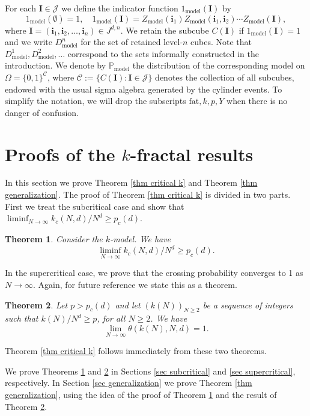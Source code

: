 \documentclass[11pt,a4paper]{article}
\newcommand{\Ib}{\ensuremath{\mathbf{I}}}
\newcommand{\Ii}{\ensuremath{\mathbf{i}}}
\newcommand{\pc}{\ensuremath{p_{c}(d)}}
\newcommand{\IP}{\ensuremath{\mathbb{P}}}
\newcommand{\CC}{\ensuremath{\mathcal{C}}}
\newcommand{\JJ}{\ensuremath{\mathcal{J}}}
\newtheorem{theorem}{Theorem}[section]
\theoremstyle{remark}
\begin{document}
For each $\Ib \in \JJ$ we define the indicator function $1_{\text{model}}(\Ib)$ by
\[
1_{\text{model}}(\emptyset)=1,\quad 1_{\text{model}}(\Ib)=Z_{\text{model}}(\Ii_1) Z_{\text{model}}(\Ii_1,\Ii_2) \cdots Z_{\text{model}}(\Ib),
\]
where $\Ib=(\Ii_1,\Ii_2,\ldots,\Ii_n) \in J^{d,n}$. We retain the subcube $C(\Ib)$ if $1_{\text{model}}(\Ib)=1$ and we write $D_{\text{model}}^n$ for the set of retained level-$n$ cubes. Note that $D_{\text{model}}^1, D_{\text{model}}^2, \ldots$ correspond to the sets informally constructed in the introduction. We denote by $\IP_{\text{model}}$ the distribution of the corresponding model on $\Omega = \{0,1\}^{\CC}$, where $\CC:=\{C(\Ib): \Ib \in \JJ\}$ denotes the collection of all subcubes, endowed with the usual sigma algebra generated by the cylinder events. To simplify the notation, we will drop the subscripts $\text{fat},k,p,Y$ when there is no danger of confusion.



\section[Proofs of the k-fractal results]{Proofs of the $k$-fractal results}\label{sec proof k fractal}

In this section we prove Theorem \ref{thm critical k} and Theorem \ref{thm generalization}. The proof of Theorem \ref{thm critical k} is divided in two parts. First we treat the subcritical case and show that $\liminf_{N \to \infty} k_c(N,d)/N^d \geq \pc$.


\begin{theorem}\label{thm subcritical}
Consider the $k$-model. We have
\[
\liminf_{N \to \infty} k_c(N,d)/N^d \geq \pc.
\]                                           
\end{theorem}
\noindent
In the supercritical case, we prove that the crossing probability converges to 1 as $N \to \infty$. Again, for future reference we state this as a theorem.


\begin{theorem}\label{thm supercritical}
Let $p>\pc$ and let $(k(N))_{N\geq 2}$ be a sequence of integers such that $k(N) / N^d \geq p$, for all $N \geq 2$. We have
\[
 \lim_{N \to \infty} \theta(k(N),N,d) = 1.
\]
\end{theorem}
\noindent
Theorem \ref{thm critical k} follows immediately from these two theorems.


We prove Theorems \ref{thm subcritical} and \ref{thm supercritical} in Sections \ref{sec subcritical} and \ref{sec supercritical}, respectively. In Section \ref{sec generalization} we prove Theorem \ref{thm generalization}, using the idea of the proof of Theorem \ref{thm subcritical} and the result of Theorem \ref{thm supercritical}.
\end{document}
